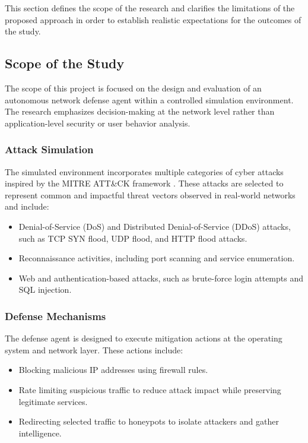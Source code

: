 \documentclass[12pt,a4paper]{report}
\begin{document}
This section defines the scope of the research and clarifies the limitations of the proposed approach in order to establish realistic expectations for the outcomes of the study.

\subsection{Scope of the Study}

The scope of this project is focused on the design and evaluation of an autonomous network defense agent within a controlled simulation environment.
The research emphasizes decision-making at the network level rather than application-level security or user behavior analysis.

\subsubsection{Attack Simulation}

The simulated environment incorporates multiple categories of cyber attacks inspired by the MITRE ATT\&CK framework \cite{mitreAttack2023}.
These attacks are selected to represent common and impactful threat vectors observed in real-world networks and include:

\begin{itemize}
    \item Denial-of-Service (DoS) and Distributed Denial-of-Service (DDoS) attacks, such as TCP SYN flood, UDP flood, and HTTP flood attacks.
    \item Reconnaissance activities, including port scanning and service enumeration.
    \item Web and authentication-based attacks, such as brute-force login attempts and SQL injection.
\end{itemize}

\subsubsection{Defense Mechanisms}

The defense agent is designed to execute mitigation actions at the operating system and network layer.
These actions include:

\begin{itemize}
    \item Blocking malicious IP addresses using firewall rules.
    \item Rate limiting suspicious traffic to reduce attack impact while preserving legitimate services.
    \item Redirecting selected traffic to honeypots to isolate attackers and gather intelligence.
\end{itemize}
\end{document}
